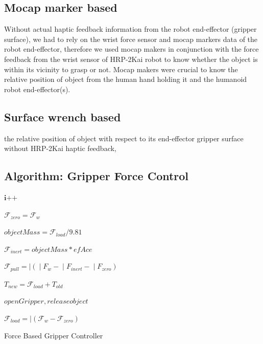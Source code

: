 \documentclass[a4paper, 12pt, oneside]{Thesis}  %
\begin{document}
\subsection{Mocap marker based}
Without actual haptic feedback information from the robot end-effector (gripper surface), we had to rely on the wrist force sensor and mocap markers data of the robot end-effector, therefore we used mocap makers in conjunction with the force feedback from the wrist sensor of HRP-2Kai robot to know whether the object is within its vicinity to grasp or not. Mocap makers were crucial to know the relative position of object from the human hand holding it and the humanoid robot end-effector(s).




\subsection{Surface wrench based}
the relative position of object with respect to its end-effector gripper surface without HRP-2Kai haptic feedback,



\subsection{Algorithm: Gripper Force Control}

\begin{algorithm}[H]
	\DontPrintSemicolon
	
	\textit{$\textbf{i++}$} 
	
	{
		{
			$\mathcal{F}_{zero}= \mathcal{F}_{w}$
		}
		{
			$objectMass = \mathcal{F}_{load}/9.81 $
			
			$\mathcal{F}_{inert} = objectMass * efAce  $
			
			$\mathcal{F}_{pull} = \vert{(\mathcal\vert{{F}}_{w} - \mathcal\vert{{F}}_{inert} - \mathcal\vert{{F}}_{zero}) }$
			
			$T_{new} = \mathcal{F}_{load} + T_{old}$
			
			{
				$openGripper, release object$
			}
		}
	}
	\Else
	{
		{
			$\mathcal{F}_{load} = \vert{(\mathcal{F}_{w} - \mathcal{F}_{zero})} $
		}
	}
	\caption{Force Based Gripper Controller}
\end{algorithm}
\end{document}
